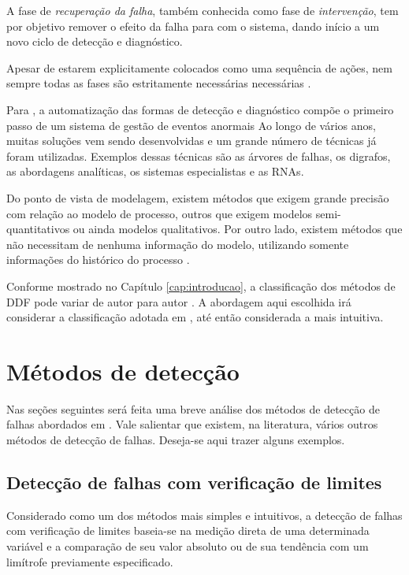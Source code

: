 A fase de {\it recuperação da falha}, também conhecida como fase de {\it
intervenção}, tem por objetivo remover o efeito da falha para com o sistema,
dando início a um novo ciclo de detecção e diagnóstico.

Apesar de estarem explicitamente colocados como uma sequência de ações, nem
sempre todas as fases são estritamente necessárias necessárias
\cite{chiang:2001}. 

Para , a automatização das formas de detecção e
diagnóstico compõe o primeiro passo de um sistema de gestão de eventos anormais
Ao longo de vários anos, muitas soluções vem sendo desenvolvidas e um grande
número de técnicas já foram utilizadas. Exemplos dessas técnicas são as árvores
de falhas, os digrafos, as abordagens analíticas, os sistemas especialistas e as
RNAs.

\fussy
Do ponto de vista de modelagem, existem métodos que exigem grande precisão com
relação ao modelo de processo, outros que exigem modelos semi-quantitativos ou
ainda modelos qualitativos. Por outro lado, existem métodos que não necessitam
de nenhuma informação do modelo, utilizando somente informações do histórico do
processo \cite{venkatasu:2003a}.
\sloppy

Conforme mostrado no Capítulo \ref{cap:introducao}, a classificação dos métodos
de DDF pode variar de autor para autor
\cite{venkatasu:2003a,angeli:2004,zhang:2008,isermann:2006}. A abordagem aqui
escolhida irá considerar a classificação adotada em ,
até então considerada a mais intuitiva.

\section{Métodos de detecção}
Nas seções seguintes será feita uma breve análise dos métodos de detecção de
falhas abordados em . Vale salientar que existem, na
literatura, vários outros métodos de detecção de falhas. Deseja-se aqui trazer
alguns exemplos.

\subsection{Detecção de falhas com verificação de limites}
Considerado como um dos métodos mais simples e intuitivos, a detecção de falhas
com verificação de limites baseia-se na medição direta de uma determinada
variável e a comparação de seu valor absoluto ou de sua tendência com um
limítrofe previamente especificado.

